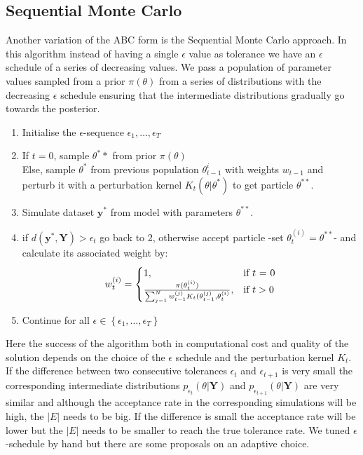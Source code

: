 \documentclass[12pt,a4paper,titlepage]{article}
\begin{document}
\subsection{Sequential Monte Carlo}
Another variation of the ABC form is the Sequential Monte Carlo approach\cite{toni2009abc}. In this algorithm instead of having a single $\epsilon$ value as tolerance we have an $\epsilon$ schedule of a series of decreasing values. We pass a population of parameter values sampled from a prior $\pi(\theta)$  from a series of distributions with the decreasing $\epsilon$ schedule ensuring that the intermediate distributions gradually go towards the posterior.
\begin{enumerate}[noitemsep]
\item{Initialise the $\epsilon$-sequence $\epsilon_{1}, \dots, \epsilon_{T}$}
\item{If $t=0$, sample $\theta^**$ from prior $\pi(\theta)$\\
Else, sample $\theta^*$ from previous population $\theta_{t-1}^{i}$ with weights $w_{t-1}$ and perturb it with a perturbation kernel $K_{t}(\theta|\theta^*) $ to get particle $\theta^{**}$.}
\item{Simulate dataset $\mathbf{y}^*$ from model with parameters $\theta^{**}$.}
\item{if $d(\mathbf{y}^*, \mathbf{Y}) > \epsilon_{t}$ go back to 2, otherwise accept particle -set $\theta_{t}^{(i)} = \theta^{**}$- and calculate its associated weight by:
\begin{equation*}
w_{t}^{(i)} = \begin{cases} 1, & \mbox{if } t\mbox{ = 0} \\ \frac{\pi(\theta_{t}^{(i)})}{\sum_{j-1}^N w_{t-1}^{(j)}K_{t}(\theta_{t-1}^{(j)}, \theta_{t}^{(i)}} , & \mbox{if } \mbox{$ t > 0$} \end{cases}
\end{equation*} }
\item{Continue for all $\epsilon \in \left\{{\epsilon_{1}, \dots, \epsilon_{T}}\right\}$}
\end{enumerate}
Here the success of the algorithm both in computational cost and quality of the solution depends on the choice of the $\epsilon$ schedule and the perturbation kernel $K_{t}$. If the difference between two consecutive tolerances $\epsilon_{t}$ and $\epsilon_{t+1}$ is very small the corresponding intermediate distributions $p_{\epsilon_{t}}(\theta | \mathbf{Y}) $ and  $p_{\epsilon_{t+1}}(\theta | \mathbf{Y}) $ are very similar and although the acceptance rate in the corresponding simulations will be high, the $\left|{E}\right|$ needs to be big. If the difference is small the acceptance rate will be lower but the $\left|{E}\right|$ needs to be smaller to reach the true tolerance rate\cite{filippi2011optimal}. We tuned $\epsilon$-schedule by hand but there are some proposals on an adaptive choice\cite{del2012adaptive}.
\end{document}
